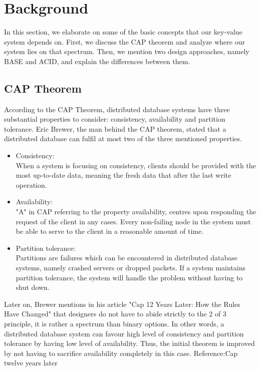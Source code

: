 \section{Background}
\label{sec:background}
In this section, we elaborate on some of the basic concepts that our key-value system depends on. First, we discuss the CAP theorem and analyze where our system lies on that spectrum. Then, we mention two design approaches, namely BASE and ACID, and explain the differences between them.

\subsection{CAP Theorem}
\label{sec:backgorund_cap}  %
According to the CAP Theorem, distributed database systems have three substantial properties to consider: consistency, availability and partition tolerance. Eric Brewer, the man behind the CAP theorem, stated that a distributed database can fulfil at most two of the three mentioned properties\cite{brewer2000towards}.

\begin{itemize}
  \item Consistency: \\
  When a system is focusing on consistency, clients should be provided with the most up-to-date data, meaning the fresh data that after the last write operation.
  \item Availability:\\
  "A" in CAP referring to the property availability, centres upon responding the request of the client in any cases. Every non-failing node in the system must be able to serve to the client in a reasonable amount of time.
  \item Partition tolerance:\\
Partitions are failures which can be encountered in distributed database systems, namely crashed servers or dropped packets. If a system maintains partition tolerance, the system will handle the problem without having to shut down.
\end{itemize}

Later on, Brewer mentions in his article "Cap 12 Years Later: How the Rules Have Changed" that designers do not have to abide strictly to the 2 of 3 principle, it is rather a spectrum than binary options. In other words, a distributed database system can favour high level of consistency and partition tolerance by having low level of availability. Thus, the initial theorem is improved by not having to sacrifice availability completely in this case. Reference:Cap twelve years later

